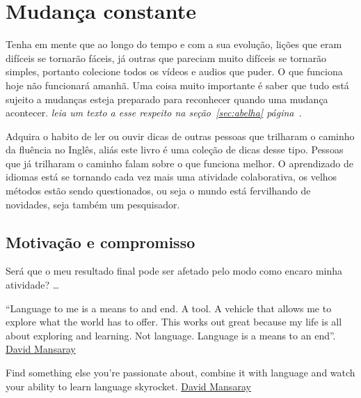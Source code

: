 
\chapter{Mudança constante}

Tenha em mente que ao longo do tempo e com a sua evolução, lições que eram
difíceis se tornarão fáceis, já outras que pareciam muito difíceis se tornarão
simples, portanto colecione todos os vídeos e audios que puder. O que funciona hoje não
funcionará amanhã. Uma coisa muito importante é saber que tudo está sujeito a mudanças
esteja preparado para reconhecer quando uma mudança acontecer.
{\em leia um texto a esse respeito na seção~\ref{sec:abelha} página~\pageref{sec:abelha}}.

\noindent
Adquira o habito de ler ou ouvir dicas de outras pessoas que trilharam
o caminho da fluência no Inglês, aliás este livro é uma coleção de dicas
desse tipo. Pessoas que já trilharam o caminho falam sobre o que
funciona melhor. O aprendizado de idiomas está se tornando cada vez mais
uma atividade colaborativa, os velhos métodos estão sendo
questionados, ou seja o mundo está fervilhando de novidades, seja também
um pesquisador.

\section{Motivação e compromisso}

Será que o meu resultado final pode ser afetado pelo modo como encaro
minha atividade? \dots

\vspace{0.3\baselineskip}
\noindent
{\footnotesize {} ``Language to me is a means to and end. A tool. A vehicle that allows me
 to explore what the world has to offer. This works out great because
 my life is all about exploring and learning. Not language. Language is
 a means to an end''. \href{http://www.davidmansaray.com/language-puzzle}{David Mansaray} }

\vspace{0.3\baselineskip}
\noindent
{\footnotesize {} Find something else you’re passionate about, combine it
with language and watch your ability to learn language skyrocket. \href{http://www.davidmansaray.com/language-puzzle}{David Mansaray} }
\vspace{0.3\baselineskip}

